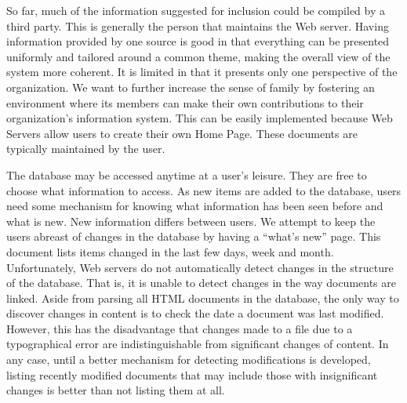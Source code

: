So far, much of the information suggested for inclusion could be compiled
by a third party.  This is generally the person that maintains the Web
server.  Having information provided by one source is good in that
everything can be presented uniformly and tailored around a common theme,
making the overall view of the system more coherent.  It is limited in that
it presents only one perspective of the organization.  We want to further
increase the sense of family by fostering an environment where its members
can make their own contributions to their organization's information
system.  This can be easily implemented because Web Servers allow users to
create their own Home Page.  These documents are typically maintained by the
user.

The database may be accessed anytime at a user's leisure.  They are free to
choose what information to access.  As new items are added to the database,
users need some mechanism for knowing what information has been seen before and
what is new.  New information differs between users.  We attempt to keep the
users abreast of changes in the database by having a ``what's new'' page.  This
document lists items changed in the last few days, week and month.
Unfortunately, Web servers do not automatically detect changes in the structure
of the database.  That is, it is unable to detect changes in the way documents
are linked.  Aside from parsing all HTML documents in the database, the only
way to discover changes in content is to check the date a document was last
modified.  However, this has the disadvantage that changes made to a file due
to a typographical error are indistinguishable from significant changes of
content.  In any case, until a better mechanism for detecting modifications is
developed, listing recently modified documents that may include those with
insignificant changes is better than not listing them at all.

